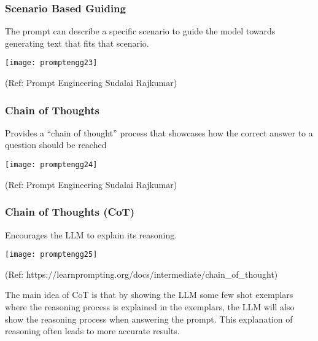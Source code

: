 \begin{frame}[fragile]\frametitle{ Scenario Based Guiding}

The prompt can describe a specific scenario to guide the model towards 
generating text that fits that scenario.

\begin{center}
\texttt{[image: promptengg23]}

{\tiny (Ref: Prompt Engineering Sudalai Rajkumar)}

\end{center}		
		
		
		


\end{frame}

\begin{frame}[fragile]\frametitle{Chain of Thoughts}

Provides a “chain of thought” process that 
showcases how the correct answer to a question should be reached

\begin{center}
\texttt{[image: promptengg24]}

{\tiny (Ref: Prompt Engineering Sudalai Rajkumar)}

\end{center}		

\end{frame}

\begin{frame}[fragile]\frametitle{Chain of Thoughts (CoT)}

Encourages the LLM to explain its reasoning. 

\begin{center}
\texttt{[image: promptengg25]}

{\tiny (Ref: https://learnprompting.org/docs/intermediate/chain\_of\_thought)}

\end{center}		

The main idea of CoT is that by showing the LLM some few shot exemplars where the reasoning process is explained in the exemplars, the LLM will also show the reasoning process when answering the prompt. This explanation of reasoning often leads to more accurate results.

\end{frame}

